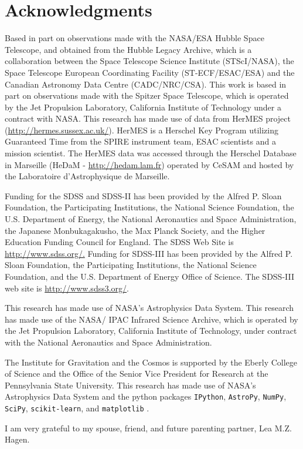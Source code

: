 \documentclass[preprint,natbib209]{aastex}
\begin{document}
\section*{Acknowledgments}
Based in part on observations made with the NASA/ESA Hubble Space Telescope, 
and obtained from the Hubble Legacy Archive, which is a collaboration between
the Space Telescope Science Institute (STScI/NASA), the Space Telescope 
European Coordinating Facility (ST-ECF/ESAC/ESA) and the 
Canadian Astronomy Data Centre (CADC/NRC/CSA). 
This work is based in part on observations made with the Spitzer Space Telescope, 
which is operated by the Jet Propulsion Laboratory, California Institute of Technology under a contract with NASA.
This research has made use of data from HerMES project (\url{http://hermes.sussex.ac.uk/}). 
HerMES is a Herschel Key Program utilizing Guaranteed Time from the SPIRE instrument team,
ESAC scientists and a mission scientist.
The HerMES data was accessed through the Herschel Database in 
Marseille (HeDaM - \url{http://hedam.lam.fr}) operated by CeSAM and
hosted by the Laboratoire d'Astrophysique de Marseille.

Funding for the SDSS and SDSS-II has been provided by the Alfred P. Sloan Foundation, 
the Participating Institutions, the National Science Foundation, the U.S. Department of Energy, 
the National Aeronautics and Space Administration, the Japanese Monbukagakusho, 
the Max Planck Society, and the Higher Education Funding Council for England. 
The SDSS Web Site is \url{http://www.sdss.org/.}
Funding for SDSS-III has been provided by the Alfred P. Sloan Foundation, the Participating Institutions, 
the National Science Foundation, and the U.S. Department of Energy Office of Science. 
The SDSS-III web site is \url{http://www.sdss3.org/}.

This research has made use of NASA's Astrophysics Data System.
This research has made use of the NASA/ IPAC Infrared Science Archive, 
which is operated by the Jet Propulsion Laboratory, California Institute of Technology, 
under contract with the National Aeronautics and Space Administration.

The Institute for Gravitation and the Cosmos is 
supported by the Eberly College of Science and the Office of the Senior Vice
President for Research at the Pennsylvania 
State University. This research has made use of NASA's Astrophysics Data System 
and the python packages \texttt{IPython}, \texttt{AstroPy}, 
\texttt{NumPy}, \texttt{SciPy}, \texttt{scikit-learn}, and \texttt{matplotlib}
 \citep{ipython, astropy, numpy, scipy, scikit-learn, matplotlib}.

I am very grateful to my spouse, friend, and future parenting partner, Lea M.Z. Hagen.


\end{document}
